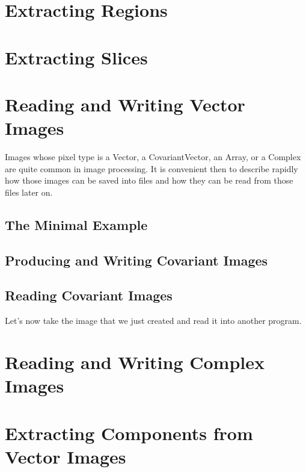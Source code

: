 \section{Extracting Regions}
\label{sec:ImagReadRegionOfInterestWrite}


\section{Extracting Slices}
\label{sec:ImagReadExtractWrite}



\section{Reading and Writing Vector Images}
\label{sec:VectorImagReadWrite}

Images whose pixel type is a Vector, a CovariantVector, an Array, or a Complex
are quite common in image processing. It is convenient then to describe rapidly
how those images can be saved into files and how they can be read from those
files later on.

\subsection{The Minimal Example}
\label{VectorImageReadWrite}


\subsection{Producing and Writing Covariant Images}
\label{CovariantVectorImageWrite}


\subsection{Reading Covariant Images}
\label{CovariantVectorImageRead}
Let's now take the image that we just created and read it into another program.



\section{Reading and Writing Complex Images}
\label{sec:ComplexImagReadWrite}



\section{Extracting Components from Vector Images}
\label{sec:VectorImageExtractComponent}



